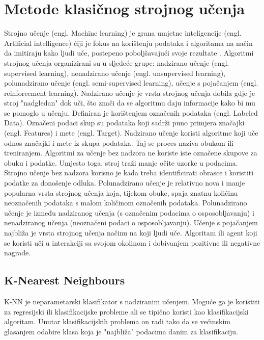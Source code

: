 \documentclass[]{foi}
\begin{document}
\section{Metode klasičnog strojnog učenja}
Strojno učenje (engl. Machine learning) je grana umjetne inteligencije (engl. Artificial intelligence) čiji je fokus na korištenju podataka i algoritama na način da imitiraju kako ljudi uče, postepeno poboljšavajući svoje rezultate \cite{ibmcom}. 
Algoritmi strojnog učenja organizirani su u sljedeće grupe: nadzirano učenje (engl. supervised learning), nenadzirano učenje (engl. unsupervised learning), polunadzirano učenje (engl. semi-supervised learning), učenje s pojačanjem (engl. reinforcement learning). 
Nadzirano učenje je vrsta strojnog učenja dobila gdje je stroj "nadgledan" dok uči, što znači da se algoritmu daju informacije kako bi mu se pomoglo u učenju. Definiran je korištenjem označenih podataka (engl. Labeled Data). Označeni podaci skup su podataka koji sadrži puno primjera značajki (engl. Features) i mete (engl. Target). Nadzirano učenje koristi algoritme koji uče odnos značajki i mete iz skupa podataka. Taj se proces naziva obukom ili treniranjem. \cite{Coursera2023}
Algoritmi za učenje bez nadzora ne koriste iste označene skupove za obuku i podatke. Umjesto toga, stroj traži manje očite uzorke u podacima. Strojno učenje bez nadzora korisno je kada treba identificirati obrasce i koristiti podatke za donošenje odluka. \cite{Coursera2023}
Polunadzirano učenje je relativno nova i manje popularna vrsta strojnog učenja koja, tijekom obuke, spaja znatnu količinu neoznačenih podataka s malom količinom označenih podataka. Polunadzirano učenje je između nadziranog učenja (s označenim podacima o osposobljavanju) i nenadziranog učenja (neoznačeni podaci o osposobljavanju). \cite{Datacamp}
Učenje s pojačanjem najbliža je vrsta strojnog učenja načinu na koji ljudi uče. Algoritam ili agent koji se koristi uči u interakciji sa svojom okolinom i dobivanjem pozitivne ili negativne nagrade. \cite{Coursera2023}

\subsection{K-Nearest Neighbours}
K-NN je neparametarski klasifikator s nadziranim učenjem. Moguće ga je koristiti za regresijski ili klasifikacijske probleme ali se tipično koristi kao klasifikacijski algoritam. Unutar klasifikacijskih problema on radi tako da se većinskim glasanjem odabire klasa koja je "najbliža" podacima danim za klasifikaciju. 
\end{document}
